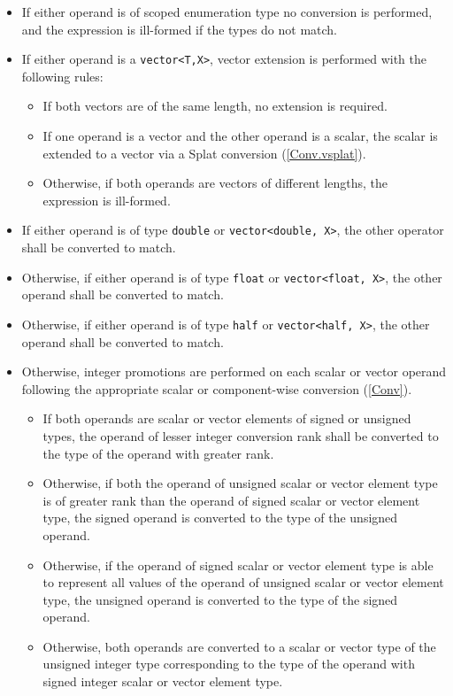 \begin{itemize}
  \item If either operand is of scoped enumeration type no conversion is
  performed, and the expression is ill-formed if the types do not match.
  \item If either operand is a \texttt{vector<T,X>}, vector extension is
  performed with the following rules:
  \begin{itemize}
    \item If both vectors are of the same length, no extension is required.
    \item If one operand is a vector and the other operand is a scalar, the
    scalar is extended to a vector via a Splat conversion (\ref{Conv.vsplat}).
    \item Otherwise, if both operands are vectors of different lengths, the
    expression is ill-formed.
  \end{itemize}
  \item If either operand is of type \texttt{double} or \texttt{vector<double,
  X>}, the other operator shall be converted to match.
  \item Otherwise, if either operand is of type \texttt{float} or \texttt{vector<float,
  X>}, the other operand shall be converted to match.
  \item Otherwise, if either operand is of type \texttt{half} or \texttt{vector<half, X>},
  the other operand shall be converted to match.
  \item Otherwise, integer promotions are performed on each scalar or vector
  operand following the appropriate scalar or component-wise conversion
  (\ref{Conv}).
  \begin{itemize}
    \item If both operands are scalar or vector elements of signed or unsigned
    types, the operand of lesser integer conversion rank shall be converted to
    the type of the operand with greater rank.
    \item Otherwise, if both the operand of unsigned scalar or vector element
    type is of greater rank than the operand of signed scalar or vector element
    type, the signed operand is converted to the type of the unsigned operand.
    \item Otherwise, if the operand of signed scalar or vector element type is
    able to represent all values of the operand of unsigned scalar or vector
    element type, the unsigned operand is converted to the type of the signed
    operand.
    \item Otherwise, both operands are converted to a scalar or vector type of
    the unsigned integer type corresponding to the type of the operand with
    signed integer scalar or vector element type.
  \end{itemize}
\end{itemize}

